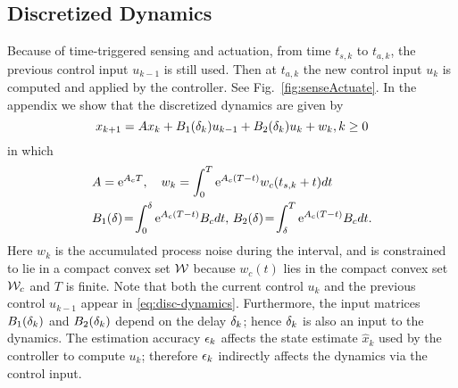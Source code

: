 \subsection{Discretized Dynamics}
Because of time-triggered sensing and actuation, from time $t_{s,k}$ to $t_{a,k}$, the  previous control input $u_{k-1}$
is still used.
Then at $t_{a,k}$ the new control input $u_{k}$
is computed and applied by the controller.
See Fig.~\ref{fig:senseActuate}.
In the appendix we show that the discretized dynamics are given by
\begin{equation}
\label{eq:disc-dynamics}
x_{k+1}=Ax_{k}+B_{1}(\delta_k)u_{k-1}+B_{2}(\delta_k)u_{k}+w_{k}, k\geq0
\end{equation}
in which
\begin{eqnarray*}
&A=\eu^{A_{c}T}, \quad
w_{k}%
=\int_{0}^{T}\eu^{A_{c}(T-t)}w_{c}(t_{s,k}+t) dt
\\
&B_{1}(\sDelay)%
\!=\!\int_{0}^{\sDelay}\eu^{A_{c}(T-t)}B_{c} dt,\,
B_{2}(\sDelay)%
\!=\!\int_{\sDelay}^{T}\eu^{A_{c}(T-t)}B_{c} dt \text.
\end{eqnarray*}
Here $w_{k}$ is the accumulated process noise during the interval, and is constrained to lie in a compact convex set $\mathcal{W}$ because $w_c(t)$ lies in the compact convex set $\mathcal{W}_c$ and $T$ is finite.
Note that both the current control $u_{k}$ and the previous
control $u_{k-1}$ appear in \eqref{eq:disc-dynamics}.
Furthermore, the input matrices $B_{1}(\delta_k)$ and $B_{2}(\delta_k)$
depend on the delay $\delta_k$; hence $\delta_k$ is also an
input to the dynamics.
The estimation accuracy $\epsilon_k$ affects the state estimate
$\hat{x}_{k}$ %
used by the controller to compute $u_{k}$;
therefore $\epsilon_k$ indirectly affects the dynamics via the control
input.







